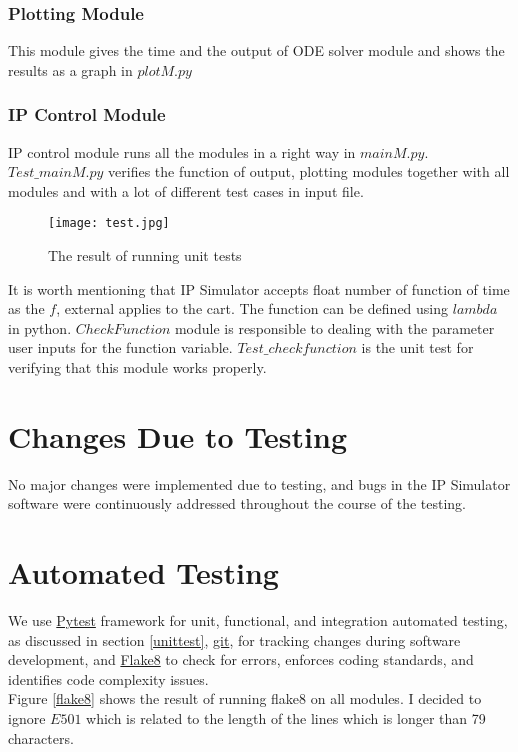 \documentclass[12pt, titlepage]{article}
\begin{document}
\subsubsection{Plotting Module}
This module gives the time and the output of ODE solver module and shows the results as a graph in \href{https://github.com/MinMah23/CAS741-Project/blob/main/src/plotM.py}{$plotM.py$}

\subsubsection{IP Control Module}\label{main}

IP control module runs all the modules in a right way in \href{https://github.com/MinMah23/CAS741-Project/blob/main/src/mainM.py}{$mainM.py$}. \href{https://github.com/MinMah23/CAS741-Project/blob/main/test/test_mainM.py}{$Test\_mainM.py$} verifies the function of output, plotting modules together with all modules and with a lot of different test cases in input file.

\begin{figure}[H]
\begin{center}
\texttt{[image: test.jpg]}
 \caption{The result of running unit tests}
 \label{unit test}
 \end{center}
 \end{figure}
It is worth mentioning that IP Simulator accepts float number of function of time as the $f$, external applies to the cart. The function can be defined using $lambda$ in python. $CheckFunction$ module is responsible to dealing with the parameter user inputs for the function variable. \href{https://github.com/MinMah23/CAS741-Project/blob/main/test/test_checkFunction.py}{$Test\_checkfunction$} is the unit test for verifying that this module works properly. \\

\section{Changes Due to Testing}
No major changes were implemented due to testing, and bugs in the IP Simulator software were continuously addressed throughout
the course of the testing.

\section{Automated Testing}

We use \href{https://docs.pytest.org/en/7.2.x/}{Pytest} framework for unit, functional, and integration automated testing, as discussed in section \ref{unittest}, \href{https://github.com/MinMah23/CAS741-Project}{git}, for tracking changes during software development, and \href{https://flake8.pycqa.org/en/latest/}{Flake8} to check for errors, enforces coding standards, and identifies code complexity issues.\\
Figure \ref{flake8} shows the result of running flake8 on all modules. I decided to ignore $E501$ which is related to the length of the lines which is longer than 79 characters.\\
\end{document}
